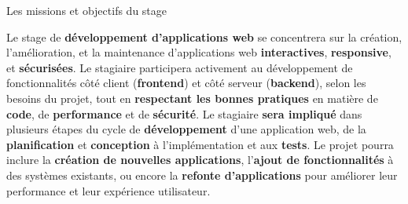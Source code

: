 \documentclass{beamer}
\begin{document}
\begin{frame}[label=sujet]{Les missions et objectifs du stage}

	\begin{center}
  		\begin{minipage}{0.9\textwidth}				

    		\hspace{0.5cm} \small Le stage de \textbf{développement d'applications web} se concentrera sur la création, l'amélioration, et la maintenance d'applications web \textbf{interactives}, \textbf{responsive}, et \textbf{sécurisées}. Le stagiaire participera activement au développement de fonctionnalités côté client (\textbf{frontend}) et côté serveur (\textbf{backend}), selon les besoins du projet, tout en \textbf{respectant les bonnes pratiques} en matière de \textbf{code}, de \textbf{performance} et de \textbf{sécurité}. Le stagiaire \textbf{sera impliqué} dans plusieurs étapes du cycle de \textbf{développement} d'une application web, de la \textbf{planification} et \textbf{conception} à l'implémentation et aux \textbf{tests}. Le projet pourra inclure la \textbf{création de nouvelles applications}, l'\textbf{ajout de fonctionnalités} à des systèmes existants, ou encore la \textbf{refonte d'applications} pour améliorer leur performance et leur expérience utilisateur.
				
  		\end{minipage}
	\end{center}
	\vfill
\end{frame}
\end{document}
